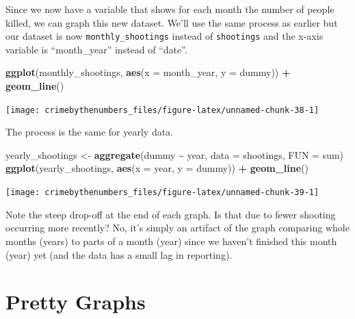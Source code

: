 \documentclass[
  12pt,
]{book}
\newenvironment{Shaded}{\begin{snugshade}}{\end{snugshade}}
\newcommand{\DataTypeTok}[1]{\textcolor[rgb]{0.27,0.27,0.27}{#1}}
\newcommand{\KeywordTok}[1]{\textcolor[rgb]{0.27,0.27,0.27}{\textbf{#1}}}
\newcommand{\NormalTok}[1]{#1}
\newcommand{\OperatorTok}[1]{\textcolor[rgb]{0.43,0.43,0.43}{\textbf{#1}}}
\newcommand{\StringTok}[1]{\textcolor[rgb]{0.5,0.5,0.5}{#1}}
\begin{document}
Since we now have a variable that shows for each month the number of people killed, we can graph this new dataset. We'll use the same process as earlier but our dataset is now \texttt{monthly\_shootings} instead of \texttt{shootings} and the x-axis variable is ``month\_year'' instead of ``date''.

\begin{Shaded}
\begin{Highlighting}[]
\KeywordTok{ggplot}\NormalTok{(monthly\_shootings, }\KeywordTok{aes}\NormalTok{(}\DataTypeTok{x =}\NormalTok{ month\_year, }\DataTypeTok{y =}\NormalTok{ dummy)) }\OperatorTok{+}
\StringTok{  }\KeywordTok{geom\_line}\NormalTok{()}
\end{Highlighting}
\end{Shaded}

\begin{center}\texttt{[image: crimebythenumbers\_files/figure-latex/unnamed-chunk-38-1]} \end{center}

The process is the same for yearly data.

\begin{Shaded}
\begin{Highlighting}[]
\NormalTok{yearly\_shootings <{-}}\StringTok{ }\KeywordTok{aggregate}\NormalTok{(dummy }\OperatorTok{\textasciitilde{}}\StringTok{ }\NormalTok{year, }\DataTypeTok{data =}\NormalTok{ shootings, }\DataTypeTok{FUN =}\NormalTok{ sum)}
\KeywordTok{ggplot}\NormalTok{(yearly\_shootings, }\KeywordTok{aes}\NormalTok{(}\DataTypeTok{x =}\NormalTok{ year, }\DataTypeTok{y =}\NormalTok{ dummy)) }\OperatorTok{+}
\StringTok{  }\KeywordTok{geom\_line}\NormalTok{()}
\end{Highlighting}
\end{Shaded}

\begin{center}\texttt{[image: crimebythenumbers\_files/figure-latex/unnamed-chunk-39-1]} \end{center}

Note the steep drop-off at the end of each graph. Is that due to fewer shooting occurring more recently? No, it's simply an artifact of the graph comparing whole months (years) to parts of a month (year) since we haven't finished this month (year) yet (and the data has a small lag in reporting).

\hypertarget{pretty-graphs}{%
\section{Pretty Graphs}\label{pretty-graphs}}
\end{document}
